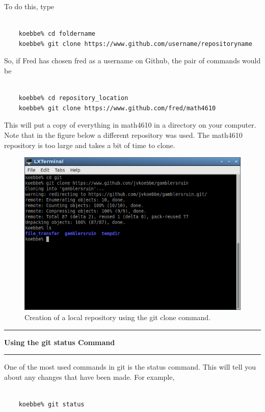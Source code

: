 \documentclass[10pt,fleqn]{article}
\begin{document}
To do this, type
\begin{verbatim}

    koebbe% cd foldername
    koebbe% git clone https://www.github.com/username/repositoryname

\end{verbatim}
So, if Fred has chosen fred as a username on Github, the pair of commands would
be
\begin{verbatim}

    koebbe% cd repository_location
    koebbe% git clone https://www.github.com/fred/math4610

\end{verbatim}
This will put a copy of everything in math4610 in a directory on your computer.
Note that in the figure below a different repository was used. The math4610
repository is too large and takes a bit of time to clone.
\vfill
\begin{figure}[h]
\centering
\includegraphics{../images/git_05.png}
\vskip0.1in
\caption{Creation of a local repository using the git clone command.}
\end{figure}
\eject
\vskip0.1in\hrule\vskip0.1in\noindent
{\bf Using the git status Command} 
\vskip0.1in\hrule\vskip0.1in\noindent
One of the most used commands in git is the status command. This will tell you
about any changes that have been made. For example,
\begin{verbatim}

    koebbe% git status

\end{verbatim}
\end{document}
